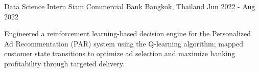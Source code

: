 \begin{cventries}
  \cventry
    {Data Science Intern} %
    {Siam Commercial Bank} %
    {Bangkok, Thailand} %
    {Jun 2022 - Aug 2022} %
    {
      \begin{cvitems} %
        \item {Engineered a reinforcement learning-based decision engine for the Personalized Ad Recommentation (PAR) system using the Q-learning algorithm; mapped customer state transitions to optimize ad selection and maximize banking profitability through targeted delivery.}
      \end{cvitems}
    }




\end{cventries}
